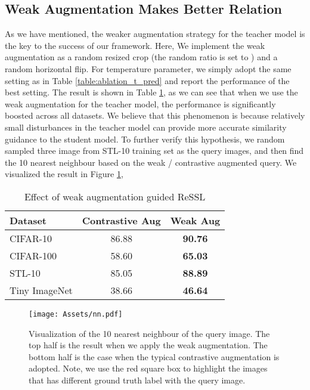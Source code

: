\documentclass{article}
\newcommand{\<}{\left\langle}
\renewcommand{\>}{\right\rangle}
\begin{document}
\subsection{Weak Augmentation Makes Better Relation}
As we have mentioned, the weaker augmentation strategy for the teacher model is the key to the success of our framework. Here, We implement the weak augmentation as a random resized crop (the random ratio is set to ) and a random horizontal flip.  For temperature parameter, we simply adopt the same setting as in Table \ref{table:ablation_t_pred} and report the performance of the best setting. The result is shown in Table \ref{table:ablation_weakaug}, as we can see that when we use the weak augmentation for the teacher model, the performance is significantly boosted across all datasets. We believe that this phenomenon is because relatively small disturbances in the teacher model can provide more accurate similarity guidance to the student model. To further verify this hypothesis, we random sampled three image from STL-10 training set as the query images, and then find the 10 nearest neighbour based on the weak / contrastive augmented query. We visualized the result in Figure \ref{fig:nn}, 








\renewcommand\arraystretch{1.0}
\begin{table}[h]
 \centering
 \caption{Effect of weak augmentation guided ReSSL }
 \vspace{-10pt}
 \label{table:ablation_weakaug}
\begin{tabular}{l c c } 
\toprule 
Dataset & Contrastive Aug & Weak Aug  \\ \hline
CIFAR-10 & 86.88 & \textbf{90.76}   \\ \hline
CIFAR-100 & 58.60 & \textbf{65.03}   \\ \hline
STL-10 & 85.05 & \textbf{88.89}   \\ \hline
Tiny ImageNet & 38.66 & \textbf{46.64}   \\
\bottomrule 
\end{tabular}
\vspace{-10pt}
\end{table}



\begin{figure}
    \centering
    \texttt{[image: Assets/nn.pdf]}
    \vspace{-20pt}
    \caption{Visualization of the 10 nearest neighbour of the query image. The top half is the result when we apply the weak augmentation. The bottom half is the case when the typical contrastive augmentation is adopted. Note, we use the red square box to highlight the images that has different ground truth label with the query image.}
    \label{fig:nn}
    \vspace{-12pt}
\end{figure}
\end{document}
